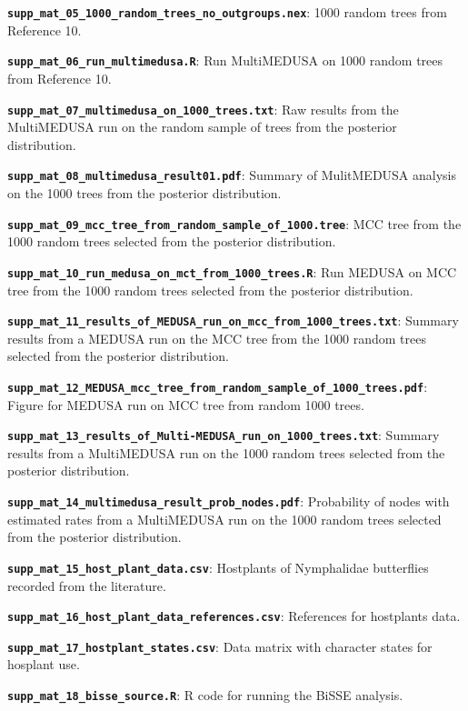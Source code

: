 \documentclass[10pt]{article}
\begin{document}
\textbf{\texttt{supp\_mat\_05\_1000\_random\_trees\_no\_outgroups.nex}}:
1000 random trees from Reference 10.

\textbf{\texttt{supp\_mat\_06\_run\_multimedusa.R}}: Run MultiMEDUSA on
1000 random trees from Reference 10.

\textbf{\texttt{supp\_mat\_07\_multimedusa\_on\_1000\_trees.txt}}: Raw
results from the MultiMEDUSA run on the random sample of trees from the
posterior distribution.

\textbf{\texttt{supp\_mat\_08\_multimedusa\_result01.pdf}}: Summary of
MulitMEDUSA analysis on the 1000 trees from the posterior distribution.

\textbf{\texttt{supp\_mat\_09\_mcc\_tree\_from\_random\_sample\_of\_1000.tree}}:
MCC tree from the 1000 random trees selected from the posterior
distribution.

\textbf{\texttt{supp\_mat\_10\_run\_medusa\_on\_mct\_from\_1000\_trees.R}}:
Run MEDUSA on MCC tree from the 1000 random trees selected from the
posterior distribution.

\textbf{\texttt{supp\_mat\_11\_results\_of\_MEDUSA\_run\_on\_mcc\_from\_1000\_trees.txt}}:
Summary results from a MEDUSA run on the MCC tree from the 1000 random
trees selected from the posterior distribution.

\textbf{\texttt{supp\_mat\_12\_MEDUSA\_mcc\_tree\_from\_random\_sample\_of\_1000\_trees.pdf}}:
Figure for MEDUSA run on MCC tree from random 1000 trees.

\textbf{\texttt{supp\_mat\_13\_results\_of\_Multi-MEDUSA\_run\_on\_1000\_trees.txt}}:
Summary results from a MultiMEDUSA run on the 1000 random trees selected
from the posterior distribution.

\textbf{\texttt{supp\_mat\_14\_multimedusa\_result\_prob\_nodes.pdf}}:
Probability of nodes with estimated rates from a MultiMEDUSA run on the
1000 random trees selected from the posterior distribution.

\textbf{\texttt{supp\_mat\_15\_host\_plant\_data.csv}}: Hostplants of
Nymphalidae butterflies recorded from the literature.

\textbf{\texttt{supp\_mat\_16\_host\_plant\_data\_references.csv}}:
References for hostplants data.

\textbf{\texttt{supp\_mat\_17\_hostplant\_states.csv}}: Data matrix with
character states for hosplant use.

\textbf{\texttt{supp\_mat\_18\_bisse\_source.R}}: R code for running the
BiSSE analysis.
\end{document}

